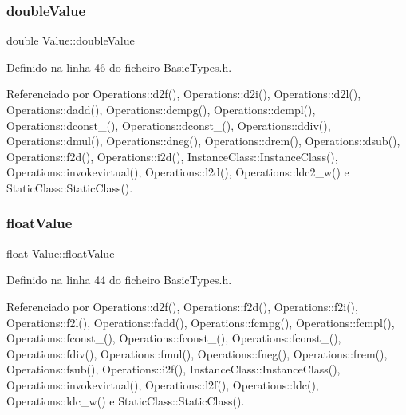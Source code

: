 \mbox{\label{structValue_a645fe257d42cf5076170f86f9f1ab65c}} 
\subsubsection{\texorpdfstring{double\+Value}{doubleValue}}
{\footnotesize\ttfamily double Value\+::double\+Value}



Definido na linha 46 do ficheiro Basic\+Types.\+h.



Referenciado por Operations\+::d2f(), Operations\+::d2i(), Operations\+::d2l(), Operations\+::dadd(), Operations\+::dcmpg(), Operations\+::dcmpl(), Operations\+::dconst\+\_(), Operations\+::dconst\+\_(), Operations\+::ddiv(), Operations\+::dmul(), Operations\+::dneg(), Operations\+::drem(), Operations\+::dsub(), Operations\+::f2d(), Operations\+::i2d(), Instance\+Class\+::\+Instance\+Class(), Operations\+::invokevirtual(), Operations\+::l2d(), Operations\+::ldc2\+\_\+w() e Static\+Class\+::\+Static\+Class().

\mbox{\label{structValue_a45b6c1f608872f5420b3da208a7c1ef0}} 
\subsubsection{\texorpdfstring{float\+Value}{floatValue}}
{\footnotesize\ttfamily float Value\+::float\+Value}



Definido na linha 44 do ficheiro Basic\+Types.\+h.



Referenciado por Operations\+::d2f(), Operations\+::f2d(), Operations\+::f2i(), Operations\+::f2l(), Operations\+::fadd(), Operations\+::fcmpg(), Operations\+::fcmpl(), Operations\+::fconst\+\_(), Operations\+::fconst\+\_(), Operations\+::fconst\+\_(), Operations\+::fdiv(), Operations\+::fmul(), Operations\+::fneg(), Operations\+::frem(), Operations\+::fsub(), Operations\+::i2f(), Instance\+Class\+::\+Instance\+Class(), Operations\+::invokevirtual(), Operations\+::l2f(), Operations\+::ldc(), Operations\+::ldc\+\_\+w() e Static\+Class\+::\+Static\+Class().

\mbox{\label{structValue_a0a2a9c06ef5a473232b4349395fd68dd}} 

